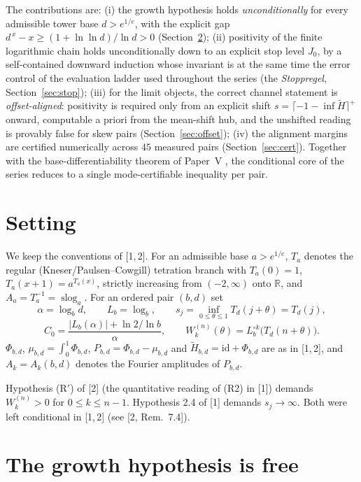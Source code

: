 \documentclass[11pt]{article}
\newcommand{\R}{\mathbb{R}}
\begin{document}
The contributions are: (i) the growth hypothesis holds \emph{unconditionally}
for every admissible tower base $d>e^{1/e}$, with the explicit gap
$d^{\,x}-x\ge(1+\ln\ln d)/\ln d>0$ (Section~\ref{sec:growth}); (ii)
positivity of the finite logarithmic chain holds unconditionally down to an
explicit stop level $J_0$, by a self-contained downward induction whose
invariant is at the same time the error control of the evaluation ladder
used throughout the series (the \emph{Stoppregel}, Section~\ref{sec:stop});
(iii) for the limit objects, the correct channel statement is
\emph{offset-aligned}: positivity is required only from an explicit shift
$s=\lceil-1-\inf\widetilde H\rceil^{+}$ onward, computable a priori from
the mean-shift hub, and the unshifted reading is provably false for skew
pairs (Section~\ref{sec:offset}); (iv) the alignment margins are certified
numerically across $45$ measured pairs (Section~\ref{sec:cert}). Together
with the base-differentiability theorem of Paper~V \cite{rh}, the
conditional core of the series reduces to a single mode-certifiable
inequality per pair.

\section{Setting}

We keep the conventions of [1,\,2].  For an admissible base $a>e^{1/e}$,
$T_a$ denotes the regular (Kneser/Paulsen--Cowgill) tetration branch with
$T_a(0)=1$, $T_a(x+1)=a^{T_a(x)}$, strictly increasing from $(-2,\infty)$
onto $\R$, and $A_a=T_a^{-1}=\operatorname{slog}_a$.  For an ordered pair
$(b,d)$ set
\[
\alpha=\log_b d,\qquad L_b=\log_b,\qquad
s_j=\inf_{0\le\theta\le1}T_d(j+\theta)=T_d(j),
\]
\[
C_0=\frac{|L_b(\alpha)|+\ln 2/\ln b}{\alpha},
\qquad
W_k^{(n)}(\theta)=L_b^{\circ k}\bigl(T_d(n+\theta)\bigr).
\]
$\Phi_{b,d}$, $\mu_{b,d}=\int_0^1\Phi_{b,d}$, $P_{b,d}=\Phi_{b,d}-\mu_{b,d}$
and $\widetilde H_{b,d}=\mathrm{id}+\Phi_{b,d}$ are as in [1,\,2], and
$A_k=A_k(b,d)$ denotes the Fourier amplitudes of $P_{b,d}$.

Hypothesis (R$'$) of [2] (the quantitative reading of (R2) in [1]) demands
$W_k^{(n)}>0$ for $0\le k\le n-1$.  Hypothesis 2.4 of [1] demands
$s_j\to\infty$.  Both were left conditional in [1,\,2] (see [2, Rem.~7.4]).

\section{The growth hypothesis is free}\label{sec:growth}
\end{document}
